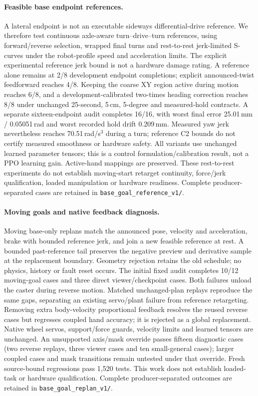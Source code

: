 \paragraph{Feasible base endpoint references.}
A lateral endpoint is not an executable sideways differential-drive reference.
We therefore test continuous axle-aware turn--drive--turn references, using
forward/reverse selection, wrapped final turns and rest-to-rest jerk-limited
S-curves under the robot-profile speed and acceleration limits. The explicit
experimental reference jerk bound is not a hardware damage rating. A reference
alone remains at 2/8 development endpoint completions; explicit announced-twist
feedforward reaches 4/8. Keeping the coarse XY region active during motion
reaches 6/8, and a development-calibrated two-times heading correction reaches
8/8 under unchanged 25-second, 5\,cm, 5-degree and measured-hold contracts.
A separate sixteen-endpoint audit completes 16/16, with worst final error
25.01\,mm / 0.05051\,rad and worst recorded hold drift 0.209\,mm. Measured
yaw jerk nevertheless reaches 70.51\,rad/s$^3$ during a turn; reference C2
bounds do not certify measured smoothness or hardware safety.
All variants use unchanged learned parameter tensors; this is a control
formulation/calibration result, not a PPO learning gain. Active-hand mappings
are preserved. These rest-to-rest experiments do not establish moving-start
retarget continuity, force/jerk qualification, loaded manipulation or hardware
readiness. Complete producer-separated cases are retained in
\texttt{base\_goal\_reference\_v1/}.

\paragraph{Moving goals and native feedback diagnosis.}
Moving base-only replans match the announced pose, velocity and acceleration,
brake with bounded reference jerk, and join a new feasible reference at rest.
A bounded past-reference tail preserves the negative preview and derivative
sample at the replacement boundary. Geometry rejection retains the old
schedule; no physics, history or fault reset occurs. The initial fixed audit
completes 10/12 moving-goal cases and three direct viewer/checkpoint cases.
Both failures unload the caster during reverse motion. Matched unchanged-plan
replays reproduce the same gaps, separating an existing servo/plant failure
from reference retargeting. Removing extra body-velocity proportional feedback
resolves the reused reverse cases but regresses coupled hand accuracy; it is
rejected as a global replacement. Native wheel servos, support/force guards,
velocity limits and learned tensors are unchanged. An unsupported axis/mask
override passes fifteen diagnostic cases (two reverse replays, three viewer
cases and ten small-general cases); larger coupled cases and mask transitions
remain untested under that override. Fresh source-bound regressions pass
1,520 tests. This work does not establish loaded-task or hardware qualification.
Complete producer-separated outcomes are retained in
\texttt{base\_goal\_replan\_v1/}.


